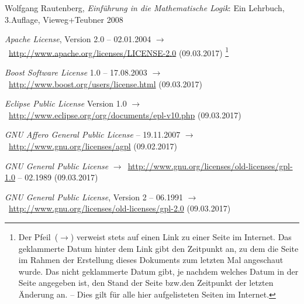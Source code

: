 \documentclass[english,ngerman,parskip=half,headsepline,footsepline,
	fleqn,notitlepage]{scrreprt}
\makeatletter
\newcommand*{\texthead}[1]{\textnormal{\textsf{\textbf{#1}}}}%
\newcommand*{\Chead}[1]{\chead{\texthead{#1}}}
\newcommand*{\Ihead}[1]{\ihead{\texthead{#1}}}
\newcommand*{\Pagestyle}{\pagestyle{scrheadings}}
\newcommand*{\Thispagestyle}{\thispagestyle{scrheadings}}
\newcommand*{\Chaptername}{\chaptername}%
\newcommand*{\beginchapter}[1]{%
	\Chead{#1}%
	\Ihead{\Chaptername~\thechapter}%
	\Pagestyle%
	\Thispagestyle%
}%
\newcommand*{\likechapter}[2][chapter]{%
	\Chead{#2}%
	\Ihead{}%
	\Pagestyle%
	\Thispagestyle%
	\addcontentsline{toc}{#1}{#2}%
}
\newcommand*{\tourl}[1]{$\rightarrow$~\url{#1}}
\newcommand*{\textbzw}{bzw.\@ }
\makeatother
\begin{document}
	\likechapter[section]{\listfigurename}
	\begin{minipage}{\linewidth-10.95pt}
		\label{dic:Abbildungsverzeichnis}
		\listoffigures
	\end{minipage}
	\Thispagestyle%

	\begin{flushleft}
		\begin{thebibliography}{12}
			\likechapter[section]{\bibname}  %
			\label{dic:Literaturverzeichnis} %

			Wolfgang Rautenberg,
			\emph{Einführung in die Mathematische Logik}:
			Ein Lehrbuch, 3.\@ Auflage, Vieweg+Teubner 2008

			\emph{Apache License}, Version 2.0
			-- 02.01.2004
			\tourl{http://www.apache.org/licenses/LICENSE-2.0} (09.03.2017)%
			\footnote{%
				Der Pfeil~($\rightarrow$)
				verweist stets auf einen Link zu einer Seite im Internet.
				Das geklammerte Datum hinter dem Link gibt den Zeitpunkt an,
				zu dem die Seite im Rahmen der Erstellung dieses Dokuments
				zum letzten Mal angeschaut wurde.
				Das nicht geklammerte Datum gibt,
				je nachdem welches Datum in der Seite angegeben ist,
				den Stand der Seite
				\textbzw den Zeitpunkt der letzten Änderung an.
				-- Dies gilt für alle hier aufgelisteten Seiten im Internet.%
			}

			\emph{Boost Software License} 1.0 -- 17.08.2003
			\tourl{http://www.boost.org/users/license.html}
			(09.03.2017)

			\emph{Eclipse Public License} Version 1.0
			\tourl{http://www.eclipse.org/org/documents/epl-v10.php}
			(09.03.2017)

			\emph{GNU Affero General Public License}
			-- 19.11.2007
			\tourl{http://www.gnu.org/licenses/agpl}
			(09.02.2017)

			\emph{GNU General Public License}
			\tourl{http://www.gnu.org/licenses/old-licenses/gpl-1.0}
			-- 02.1989 (09.03.2017)

			\emph{GNU General Public License}, Version 2
			-- 06.1991
			\tourl{http://www.gnu.org/licenses/old-licenses/gpl-2.0}
			(09.03.2017)


\end{thebibliography}
\end{flushleft}
\end{document}
